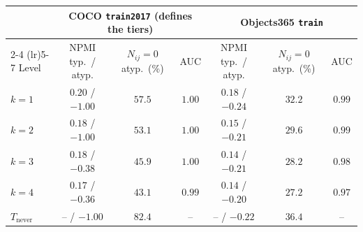 \begin{tabular}{l ccc ccc}
\toprule
& \multicolumn{3}{c}{COCO \texttt{train2017} (defines the tiers)} & \multicolumn{3}{c}{Objects365 \texttt{train}} \\
\cmidrule(lr){2-4} \cmidrule(lr){5-7}
Level & NPMI typ.\ / atyp. & $N_{ij}{=}0$ atyp.\ (\%) & AUC & NPMI typ.\ / atyp. & $N_{ij}{=}0$ atyp.\ (\%) & AUC \\
\midrule
$k=1$ & $0.20$ / $-1.00$ & $57.5$ & $1.00$ & $0.18$ / $-0.24$ & $32.2$ & $0.99$ \\
$k=2$ & $0.18$ / $-1.00$ & $53.1$ & $1.00$ & $0.15$ / $-0.21$ & $29.6$ & $0.99$ \\
$k=3$ & $0.18$ / $-0.38$ & $45.9$ & $1.00$ & $0.14$ / $-0.21$ & $28.2$ & $0.98$ \\
$k=4$ & $0.17$ / $-0.36$ & $43.1$ & $0.99$ & $0.14$ / $-0.20$ & $27.2$ & $0.97$ \\
\midrule
$T_{\text{never}}$ & -- / $-1.00$ & $82.4$ & -- & -- / $-0.22$ & $36.4$ & -- \\
\bottomrule
\end{tabular}
